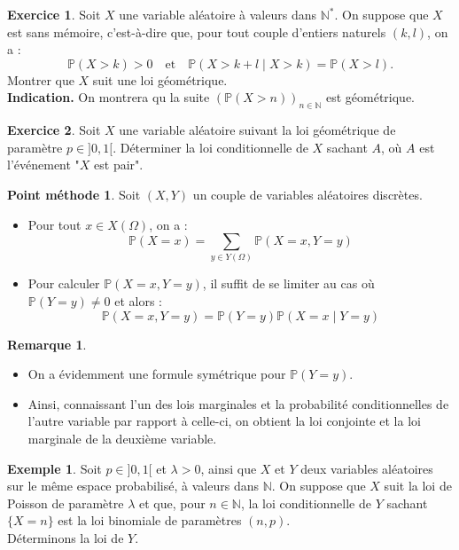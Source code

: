 \documentclass[french]{article}
\renewcommand{\P}{\mathbb{P}}
\newcommand{\N}{\mathbb{N}}
\newcommand{\st}{^*}
\theoremstyle{plain}
\theoremstyle{definition}
\newtheorem*{ex}{Exemple}
\newtheorem*{met}{Point méthode}
\newtheorem{exo}{Exercice}
\newtheorem*{rmq}{Remarque}
\theoremstyle{remark}
\begin{document}
\begin{exo}
	Soit $X$ une variable aléatoire à valeurs dans $\N\st$. On suppose que $X$ est sans mémoire, c'est-à-dire que, pour tout couple d'entiers naturels $(k,l)$, on a :
	$$\P(X>k)>0\quad\text{et}\quad\P(X>k+l\mid X>k)=\P(X>l).$$
	Montrer que $X$ suit une loi géométrique. \\
	\textbf{Indication.} On montrera qu la suite $(\P(X>n))_{n\in\N}$ est géométrique.
\end{exo}

\begin{exo}
	Soit $X$ une variable aléatoire suivant la loi géométrique de paramètre $p\in]0,1[$. Déterminer la loi conditionnelle de $X$ sachant $A$, où $A$ est l'événement "$X$ est pair".
\end{exo}

\begin{met}
	Soit $(X,Y)$ un couple de variables aléatoires discrètes.
	\begin{itemize}
		\item Pour tout $x\in X(\Omega)$, on a : $$\P(X=x)=\sum_{y\in Y(\Omega)}\P(X=x,Y=y)$$
		\item Pour calculer $\P(X=x,Y=y)$, il suffit de se limiter au cas où $\P(Y=y)\ne 0$ et alors : $$\P(X=x,Y=y)=\P(Y=y)\P(X=x\mid Y=y)$$
	\end{itemize}
\end{met}

\begin{rmq}
	\begin{itemize}
		\item On a évidemment une formule symétrique pour $\P(Y=y)$.
		\item Ainsi, connaissant l'un des lois marginales et la probabilité conditionnelles de l'autre variable par rapport à celle-ci, on obtient la loi conjointe et la loi marginale de la deuxième variable.
	\end{itemize}
\end{rmq}

\begin{ex}
	Soit $p\in]0,1[$ et $\lambda>0$, ainsi que $X$ et $Y$ deux variables aléatoires sur le même espace probabilisé, à valeurs dans $\N$. On suppose que $X$ suit la loi de Poisson de paramètre $\lambda$ et que, pour $n\in\N$, la loi conditionnelle de $Y$ sachant $\{X=n\}$ est la loi binomiale de paramètres $(n,p)$.\\
	Déterminons la loi de $Y$.
\end{ex}
\end{document}
